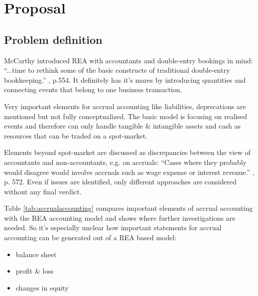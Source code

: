 
\captionsetup{width=0.8\textwidth}



\chapter{Proposal}
\section{Problem definition}\label{sec:problem}
McCarthy introduced REA with accountants and double-entry bookings in mind: “...time to rethink some of the basic constructs of traditional double-entry bookkeeping.” \cite{mccarthy1982rea}, p.554.
It definitely has it's mares by introducing quantities and connecting events that belong to one business transaction. 

Very important elements for accrual accounting like liabilities, deprecations are mentioned but not fully conceptualized.
The basic model is focusing on realised events and therefore can only handle tangible \& intangible assets and cash as resources that can be traded on a spot-market.

Elements beyond spot-market are discussed as discrepancies between the view of accountants and non-accountants, e.g. on accruals:
“Cases where they probably would disagree would involve accruals such as wage expense or interest revenue.” \cite{mccarthy1982rea}, p. 572.
Even if issues are identified, only different approaches are considered without any final verdict.

Table \ref{tab:accrualaccounting} compares important elements of accrual accounting with the REA accounting model and shows where further investigations are needed.
So it's especially unclear how important statements for accrual accounting can be generated out of a REA based model:
\begin{itemize}[noitemsep]%
	\item balance sheet
	\item profit \& loss
	\item changes in equity
\end{itemize}


